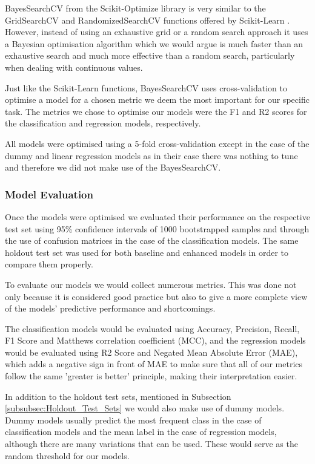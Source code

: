 BayesSearchCV from the Scikit-Optimize \citep{scikit-optimize} library is very similar to the GridSearchCV and RandomizedSearchCV functions offered by Scikit-Learn \citep{scikit-learn}. However, instead of using an exhaustive grid or a random search approach it uses a Bayesian optimisation algorithm which we would argue is much faster than an exhaustive search and much more effective than a random search, particularly when dealing with continuous values. 

Just like the Scikit-Learn functions, BayesSearchCV uses cross-validation to optimise a model for a chosen metric we deem the most important for our specific task. The metrics we chose to optimise our models were the F1 and R2 scores for the classification and regression models, respectively.

All models were optimised using a 5-fold cross-validation except in the case of the dummy and linear regression models as in their case there was nothing to tune and therefore we did not make use of the BayesSearchCV.

\subsubsection{Model Evaluation}
\label{subsubsec:Model_Evaluation}

Once the models were optimised we evaluated their performance on the respective test set using 95\% confidence intervals of 1000 bootstrapped samples and through the use of confusion matrices in the case of the classification models. The same holdout test set was used for both baseline and enhanced models in order to compare them properly. 

To evaluate our models we would collect numerous metrics. This was done not only because it is considered good practice but also to give a more complete view of the models' predictive performance and shortcomings.

The classification models would be evaluated using Accuracy, Precision, Recall, F1 Score and Matthews correlation coefficient (MCC), and the regression models would be evaluated using R2 Score and Negated Mean Absolute Error (MAE), which adds a negative sign in front of MAE to make sure that all of our metrics follow the same 'greater is better' principle, making their interpretation easier.

In addition to the holdout test sets, mentioned in Subsection \ref{subsubsec:Holdout_Test_Sets} we would also make use of dummy models. Dummy models usually predict the most frequent class in the case of classification models and the mean label in the case of regression models, although there are many variations that can be used. These would serve as the random threshold for our models.

